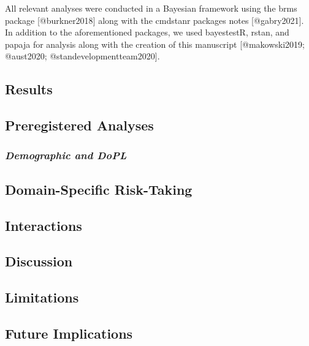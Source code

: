 \documentclass[
]{article}
\begin{document}
All relevant analyses were conducted in a Bayesian framework using the
brms package {[}@burkner2018{]} along with the cmdstanr packages notes
{[}@gabry2021{]}. In addition to the aforementioned packages, we used
bayestestR, rstan, and papaja for analysis along with the creation of
this manuscript {[}@makowski2019; @aust2020;
@standevelopmentteam2020{]}.

\hypertarget{results}{%
\subsection{Results}\label{results}}

\hypertarget{preregistered-analyses}{%
\subsection{Preregistered Analyses}\label{preregistered-analyses}}

\hypertarget{demographic-and-dopl}{%
\subsubsection{\texorpdfstring{\emph{Demographic and
DoPL}}{Demographic and DoPL}}\label{demographic-and-dopl}}

\hypertarget{domain-specific-risk-taking}{%
\subsection{Domain-Specific
Risk-Taking}\label{domain-specific-risk-taking}}

\hypertarget{interactions}{%
\subsection{Interactions}\label{interactions}}

\hypertarget{discussion}{%
\subsection{Discussion}\label{discussion}}

\hypertarget{limitations}{%
\subsection{Limitations}\label{limitations}}

\hypertarget{future-implications}{%
\subsection{Future Implications}\label{future-implications}}
\end{document}
